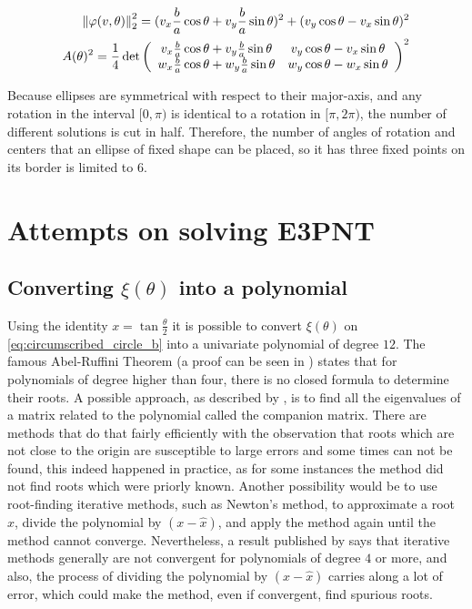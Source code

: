\begin{align}\label{eq:dd}
	\left\lVert\varphi(v, \theta)\right\rVert_{2}^2 = (v_x\frac{b}{a}\cos\theta + v_y\frac{b}{a}\sin\theta)^2 + (v_y\cos\theta - v_x\sin\theta)^2\\
	\label{eq:dd2} A(\theta)^2=\dfrac{1}{4}\det\left(
	\begin{array}{cc}
		v_x\frac{b}{a}\cos\theta + v_y\frac{b}{a}\sin\theta&v_y\cos\theta - v_x\sin\theta\\
		w_x\frac{b}{a}\cos\theta + w_y\frac{b}{a}\sin\theta&w_y\cos\theta - w_x\sin\theta
	\end{array}\right)^2
\end{align}

Because ellipses are symmetrical with respect to their major-axis, and any rotation in the interval $[0, \pi)$ is identical to a rotation in $[\pi, 2\pi)$, the number of different solutions is cut in half.
Therefore, the number of angles of rotation and centers that an ellipse of fixed shape can be placed, so it has three fixed points on its border is limited to $6$.

\section{Attempts on solving E3PNT}

\subsection{Converting $\xi(\theta)$ into a polynomial}

Using the identity $x = \tan{\frac{\theta}{2}}$ it is possible to convert $\xi(\theta)$ on \autoref{eq:circumscribed_circle_b} into a univariate polynomial of degree $12$. The famous Abel-Ruffini Theorem (a proof can be seen in ) states that for polynomials of degree higher than four, there is no closed formula to determine their roots. A possible approach, as described by , is to find all the eigenvalues of a matrix related to the polynomial called the companion matrix. There are methods that do that fairly efficiently with the observation that roots which are not close to the origin are susceptible to large errors and some times can not be found, this indeed happened in practice, as for some instances the method did not find roots which were priorly known. Another possibility would be to use root-finding iterative methods, such as Newton's method, to approximate a root $\hat{x}$, divide the polynomial by $(x-\hat{x})$, and apply the method again until the method cannot converge. Nevertheless, a result published by  says that iterative methods generally are not convergent for polynomials of degree $4$ or more, and also, the process of dividing the polynomial by $(x-\hat{x})$ carries along a lot of error, which could make the method, even if convergent, find spurious roots.

